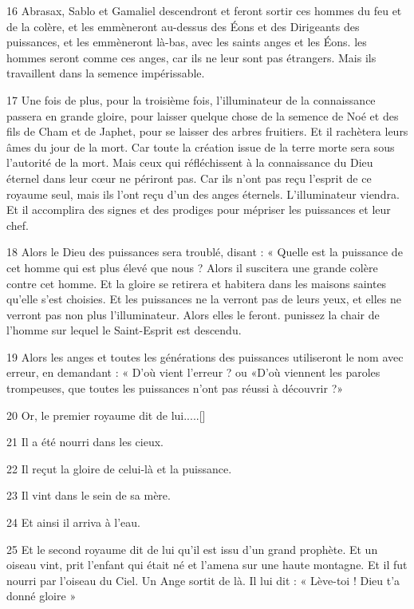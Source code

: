 \par 16 Abrasax, Sablo et Gamaliel descendront et feront sortir ces hommes du feu et de la colère, et les emmèneront au-dessus des Éons et des Dirigeants des puissances, et les emmèneront là-bas, avec les saints anges et les Éons. les hommes seront comme ces anges, car ils ne leur sont pas étrangers. Mais ils travaillent dans la semence impérissable.

\par 17 Une fois de plus, pour la troisième fois, l'illuminateur de la connaissance passera en grande gloire, pour laisser quelque chose de la semence de Noé et des fils de Cham et de Japhet, pour se laisser des arbres fruitiers. Et il rachètera leurs âmes du jour de la mort. Car toute la création issue de la terre morte sera sous l'autorité de la mort. Mais ceux qui réfléchissent à la connaissance du Dieu éternel dans leur cœur ne périront pas. Car ils n'ont pas reçu l'esprit de ce royaume seul, mais ils l'ont reçu d'un des anges éternels. L'illuminateur viendra. Et il accomplira des signes et des prodiges pour mépriser les puissances et leur chef.

\par 18 Alors le Dieu des puissances sera troublé, disant : « Quelle est la puissance de cet homme qui est plus élevé que nous ? Alors il suscitera une grande colère contre cet homme. Et la gloire se retirera et habitera dans les maisons saintes qu'elle s'est choisies. Et les puissances ne la verront pas de leurs yeux, et elles ne verront pas non plus l'illuminateur. Alors elles le feront. punissez la chair de l'homme sur lequel le Saint-Esprit est descendu.

\par 19 Alors les anges et toutes les générations des puissances utiliseront le nom avec erreur, en demandant : « D'où vient l'erreur ? ou «D'où viennent les paroles trompeuses, que toutes les puissances n'ont pas réussi à découvrir ?»

\par 20 Or, le premier royaume dit de lui.....[]
\par 21 Il a été nourri dans les cieux.
\par 22 Il reçut la gloire de celui-là et la puissance.
\par 23 Il vint dans le sein de sa mère.
\par 24 Et ainsi il arriva à l'eau.
\par 25 Et le second royaume dit de lui qu'il est issu d'un grand prophète. Et un oiseau vint, prit l'enfant qui était né et l'amena sur une haute montagne. Et il fut nourri par l'oiseau du Ciel. Un Ange sortit de là. Il lui dit : « Lève-toi ! Dieu t’a donné gloire »

